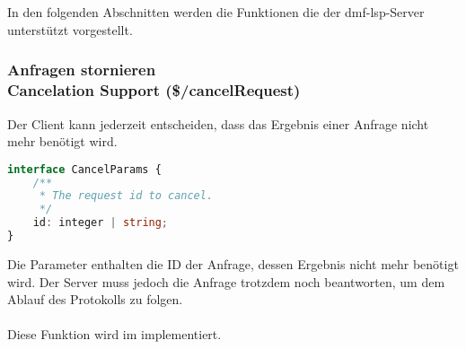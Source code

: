 \documentclass[./einleitung.tex]{subfiles}
\begin{document}
    \\\\
    In den folgenden Abschnitten werden die Funktionen die der \acrshort{dmf}-\acrshort{lsp}-Server unterstützt vorgestellt.

    \subsubsection[Anfragen stornieren]{Anfragen stornieren\\ {\textnormal{\footnotesize Cancelation Support (\$/cancelRequest) \cite{cancelation}}}}
    Der Client kann jederzeit entscheiden, dass das Ergebnis einer Anfrage nicht mehr benötigt wird.
    \begin{lstlisting}[language=Typescript,title=Definition der Parameter \cite{cancelation},label={lst:cancelParams}]
interface CancelParams {
	/**
	 * The request id to cancel.
	 */
	id: integer | string;
}
    \end{lstlisting}
    Die Parameter enthalten die ID der Anfrage, dessen Ergebnis nicht mehr benötigt wird.
    Der Server muss jedoch die Anfrage trotzdem noch beantworten, um dem Ablauf des Protokolls zu folgen.
    \\\\
    Diese Funktion wird im  implementiert.
\end{document}
